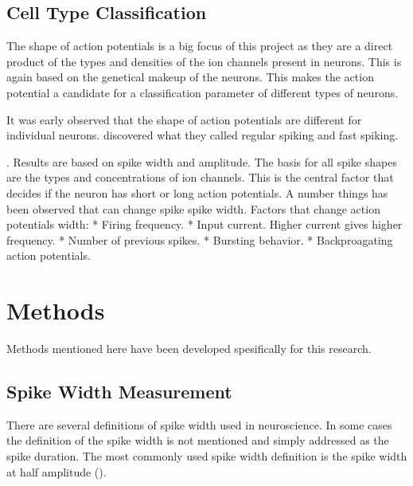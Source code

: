 \documentclass[altfont, fleqn]{uiophd}
\renewcommand{\cref}[1]{{\color{viridis_03}\mycref{#1}}}
\begin{document}
\section{Cell Type Classification}

The shape of action potentials is a big focus of this project
as they are a direct product of the types and densities of the ion channels
present in neurons. 
This is again based on the genetical makeup of the neurons. 
This makes the action potential a candidate for a classification parameter
of different types of neurons. 

It was early observed that the shape of action potentials are different for 
individual neurons. \textcite{mountcastle_cortical_1969} discovered what
they called regular spiking and fast spiking.

\cite{mountcastle_cortical_1969}.
Results are based on spike width and amplitude.
The basis for all spike shapes are the types and concentrations of
ion channels.
This is the central factor that decides if the neuron has short or long action potentials.
A number things has been observed that can change spike spike width.
Factors that change action potentials width:
* Firing frequency.
* Input current. Higher current gives higher frequency.
* Number of previous spikes.
* Bursting behavior.
* Backproagating action potentials.

\chapter{Methods}
Methods mentioned here have been developed spesifically for this research. 
\vspace{1em} 
\startcontents
{}
\section{Spike Width Measurement}
There
are several definitions of spike width used in neuroscience. 
In some cases the definition of the spike width is not mentioned
and simply addressed as the spike duration. 
The most commonly used spike width definition is the spike width at half 
amplitude
(\textcite{bean_action_2007}).
\end{document}
